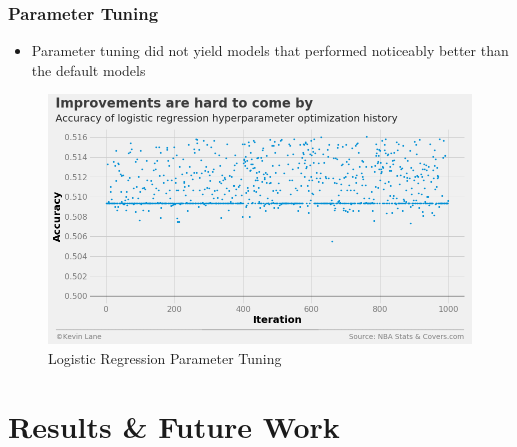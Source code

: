 \documentclass{beamer}
\begin{document}
\begin{frame}
\frametitle{Parameter Tuning}
\begin{itemize}
    \item Parameter tuning did not yield models that performed noticeably better than the default models
\end{itemize}
\begin{figure}
\includegraphics[scale=0.3]{../docs/assets/images/parameter-tuning/logistic-regression-accuracy.png}
\caption{Logistic Regression Parameter Tuning}
\end{figure}
\end{frame}

\section{Results \& Future Work}
\end{document}
